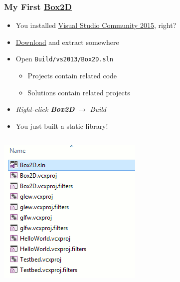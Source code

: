 \documentclass[glossy]{beamer}
\begin{document}
\begin{frame}[fragile=singleslide]
  \frametitle{My First \href{http://box2d.org/}{\underline{Box2D}}}
     
  \begin{itemize}
    \item You installed \href{https://www.visualstudio.com/downloads/download-visual-studio-vs}{\underline{Visual Studio Community 2015}}, right?
    \item \href{https://github.com/JesseTG/Box2D/archive/master.zip}{\underline{Download}} and extract somewhere
    \item Open \texttt{Build/vs2013/Box2D.sln}
    \begin{itemize}
      \item Projects contain related code
      \item Solutions contain related projects
    \end{itemize}
    \item \emph{Right-click \textbf{Box2D}} $\rightarrow$ \emph{Build}
    \item You just built a static library!
  \end{itemize}

  \begin{columns}
    \begin{column}{6cm}
      \includegraphics[width=0.9\columnwidth]{windows-03}
    \end{column}


\end{columns}
\end{frame}
\end{document}
